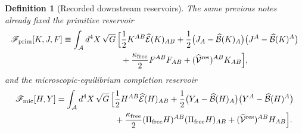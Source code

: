 \documentclass[11pt]{article}
\newcommand{\Sub}{\mathcal A}
\newcommand{\ResidualLift}{\widehat{\mathcal V}^{\mathrm{res}}}
\newcommand{\SubEinLin}{\widehat{\mathcal E}}
\newcommand{\SubGaugeVec}{\widehat{\mathcal B}}
\newcommand{\FreeProj}{\Pi_{\mathrm{free}}}
\newcommand{\GaugeAux}{Y}
\newcommand{\MicFunctional}{\mathscr F_{\mathrm{mic}}}
\newcommand{\PrimFunctional}{\mathscr F_{\mathrm{prim}}}
\newcommand{\FreeStiff}{\kappa_{\mathrm{free}}}
\newcommand{\PrimStrain}{K}
\newcommand{\PrimNeutral}{J}
\newcommand{\PrimFree}{F}
\newtheorem{definition}{Definition}
\begin{document}
\begin{definition}[Recorded downstream reservoirs]
\label{def:downstream}
The same previous notes already fixed the primitive reservoir
\begin{equation}
\begin{aligned}
\PrimFunctional[\PrimStrain,\PrimNeutral,\PrimFree]
\equiv
\int_{\Sub} d^4X\,\sqrt{G}\,
\Bigl[
&\frac12 \PrimStrain^{AB}\SubEinLin(\PrimStrain)_{AB}
+\frac12\bigl(\PrimNeutral_A-\SubGaugeVec(\PrimStrain)_A\bigr)
\bigl(\PrimNeutral^A-\SubGaugeVec(\PrimStrain)^A\bigr)
\\
&+\frac{\FreeStiff}{2}\PrimFree^{AB}\PrimFree_{AB}
+(\ResidualLift)^{AB}\PrimStrain_{AB}
\Bigr],
\end{aligned}
\label{eq:primitive}
\end{equation}
and the microscopic-equilibrium completion reservoir
\begin{equation}
\begin{aligned}
\MicFunctional[H,\GaugeAux]
=
\int_{\Sub} d^4X\,\sqrt{G}\,
\Bigl[
&\frac12 H^{AB}\SubEinLin(H)_{AB}
+\frac12\bigl(\GaugeAux_A-\SubGaugeVec(H)_A\bigr)
\bigl(\GaugeAux^A-\SubGaugeVec(H)^A\bigr)
\\
&+\frac{\FreeStiff}{2}(\FreeProj H)^{AB}(\FreeProj H)_{AB}
+(\ResidualLift)^{AB}H_{AB}
\Bigr].
\end{aligned}
\label{eq:mic}
\end{equation}
\end{definition}
\end{document}
